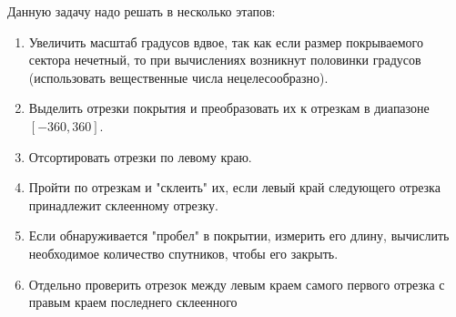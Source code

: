 \solutionSection

Данную задачу надо решать в несколько этапов:

\begin{enumerate}
    \item Увеличить масштаб градусов вдвое, так как если размер покрываемого сектора нечетный, то при вычислениях возникнут половинки градусов (использовать вещественные числа нецелесообразно).
    \item Выделить отрезки покрытия и преобразовать их к отрезкам в диапазоне $[-360, 360]$.
    \item Отсортировать отрезки по левому краю.
    \item Пройти по отрезкам и "склеить" их, если левый край следующего отрезка принадлежит склеенному отрезку. 
    \item Если обнаруживается "пробел" в покрытии, измерить его длину, вычислить необходимое количество спутников, чтобы его закрыть.
    \item Отдельно проверить отрезок между левым краем самого первого отрезка с правым краем последнего склеенного
\end{enumerate}

\codeExample

